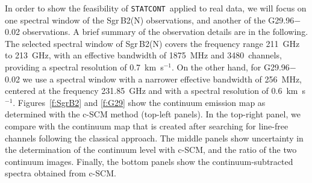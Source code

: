 \documentclass{aa}
\newcommand{\statcont} {\texttt{STATCONT}}
\begin{document}
In order to show the feasibility of \statcont\ applied to real data, we will focus on one spectral window of the Sgr\,B2(N) observations, and another of the G29.96$-$0.02 observations. A brief summary of the observation details are in the following. The selected spectral window of Sgr\,B2(N) covers the frequency range 211~GHz to 213~GHz, with an effective bandwidth of 1875~MHz and 3480~channels, providing a spectral resolution of 0.7~km~s$^{-1}$. On the other hand, for G29.96$-$0.02 we use a spectral window with a narrower effective bandwidth of 256~MHz, centered at the frequency 231.85~GHz and with a spectral resolution of 0.6~km~s$^{-1}$. Figures~\ref{f:SgrB2} and \ref{f:G29} show the continuum emission map as determined with the c-SCM method (top-left panels). In the top-right panel, we compare with the continuum map that is created after searching for line-free channels following the classical approach. The middle panels show uncertainty in the determination of the continuum level with c-SCM, and the ratio of the two continuum images. Finally, the bottom panels show the continuum-subtracted spectra obtained from c-SCM.
\end{document}
